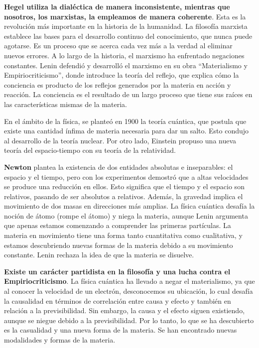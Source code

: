 \documentclass[
  jou,
  floatsintext,
  longtable,
  a4paper,
  nolmodern,
  notxfonts,
  notimes,
  12pt,
  colorlinks=true,linkcolor=blue,citecolor=blue,urlcolor=blue]{apa7}
\begin{document}
\textbf{Hegel utiliza la dialéctica de manera inconsistente, mientras
que nosotros, los marxistas, la empleamos de manera coherente}. Esta es
la revolución más importante en la historia de la humanidad. La
filosofía marxista establece las bases para el desarrollo continuo del
conocimiento, que nunca puede agotarse. Es un proceso que se acerca cada
vez más a la verdad al eliminar nuevos errores. A lo largo de la
historia, el marxismo ha enfrentado negaciones constantes. Lenin
defendió y desarrolló el marxismo en su obra ``Materialismo y
Empiriocriticismo'', donde introduce la teoría del reflejo, que explica
cómo la conciencia es producto de los reflejos generados por la materia
en acción y reacción. La conciencia es el resultado de un largo proceso
que tiene sus raíces en las características mismas de la materia.

En el ámbito de la física, se planteó en 1900 la teoría cuántica, que
postula que existe una cantidad ínfima de materia necesaria para dar un
salto. Esto condujo al desarrollo de la teoría nuclear. Por otro lado,
Einstein propuso una nueva teoría del espacio-tiempo con su teoría de la
relatividad.

\textbf{Newton} plantea la existencia de dos entidades absolutas e
inseparables: el espacio y el tiempo, pero con los experimentos demostró
que a altas velocidades se produce una reducción en ellos. Esto
significa que el tiempo y el espacio son relativos, pasando de ser
absolutos a relativos. Además, la gravedad implica el movimiento de dos
masas en direcciones más amplias. La física cuántica desafía la noción
de átomo (rompe el átomo) y niega la materia, aunque Lenin argumenta que
apenas estamos comenzando a comprender las primeras partículas. La
materia en movimiento tiene una forma tanto cuantitativa como
cualitativa, y estamos descubriendo nuevas formas de la materia debido a
su movimiento constante. Lenin rechaza la idea de que la materia se
disuelve.

\textbf{Existe un carácter partidista en la filosofía y una lucha contra
el Empiriocriticismo}. La física cuántica ha llevado a negar el
materialismo, ya que al conocer la velocidad de un electrón,
desconocemos su ubicación, lo cual desafía la causalidad en términos de
correlación entre causa y efecto y también en relación a la
previsibilidad. Sin embargo, la causa y el efecto siguen existiendo,
aunque se niegue debido a la previsibilidad. Por lo tanto, lo que se ha
descubierto es la casualidad y una nueva forma de la materia. Se han
encontrado nuevas modalidades y formas de la materia.
\end{document}
